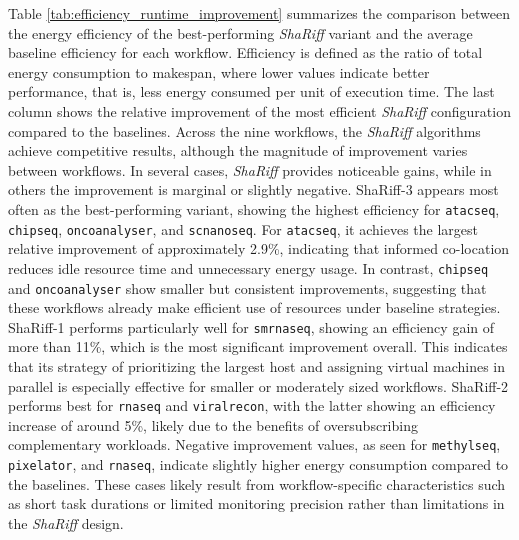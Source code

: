 Table \ref{tab:efficiency_runtime_improvement} summarizes the comparison between the energy efficiency of the best-performing \textit{ShaRiff} variant and the average baseline efficiency for each workflow. Efficiency is defined as the ratio of total energy consumption to makespan, where lower values indicate better performance, that is, less energy consumed per unit of execution time. The last column shows the relative improvement of the most efficient \textit{ShaRiff} configuration compared to the baselines.
Across the nine workflows, the \textit{ShaRiff} algorithms achieve competitive results, although the magnitude of improvement varies between workflows. In several cases, \textit{ShaRiff} provides noticeable gains, while in others the improvement is marginal or slightly negative. ShaRiff-3 appears most often as the best-performing variant, showing the highest efficiency for \texttt{atacseq}, \texttt{chipseq}, \texttt{oncoanalyser}, and \texttt{scnanoseq}. For \texttt{atacseq}, it achieves the largest relative improvement of approximately 2.9\%, indicating that informed co-location reduces idle resource time and unnecessary energy usage. In contrast, \texttt{chipseq} and \texttt{oncoanalyser} show smaller but consistent improvements, suggesting that these workflows already make efficient use of resources under baseline strategies.
ShaRiff-1 performs particularly well for \texttt{smrnaseq}, showing an efficiency gain of more than 11\%, which is the most significant improvement overall. This indicates that its strategy of prioritizing the largest host and assigning virtual machines in parallel is especially effective for smaller or moderately sized workflows. ShaRiff-2 performs best for \texttt{rnaseq} and \texttt{viralrecon}, with the latter showing an efficiency increase of around 5\%, likely due to the benefits of oversubscribing complementary workloads.
Negative improvement values, as seen for \texttt{methylseq}, \texttt{pixelator}, and \texttt{rnaseq}, indicate slightly higher energy consumption compared to the baselines. These cases likely result from workflow-specific characteristics such as short task durations or limited monitoring precision rather than limitations in the \textit{ShaRiff} design.

